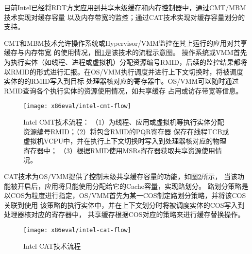 目前Intel已经将RDT方案应用到共享末级缓存和内存控制器中，通过CMT/MBM技术实现对缓存容量
以及内存带宽的监控；通过CAT技术实现对缓存容量划分的支持。

CMT和MBM技术允许操作系统或Hypervisor/VMM监控在其上运行的应用对共享缓存与内存带宽
的使用情况，图\ref{fig:intel-cmt-flow}是该技术的流程示意图。
操作系统或VMM首先为执行实体（如线程、进程或虚拟机）分配资源编号RMID，后续的监控结果都将
以RMID的形式进行汇报。在OS/VMM执行调度并进行上下文切换时，将被调度实体的的RMID写入到目标
处理器核对应的寄存器中。OS/VMM可以随时通过RMID查询各个执行实体的资源使用情况，如共享缓存
占用或访存带宽等信息。
 
\begin{figure}[H]
  \centering
  \texttt{[image: x86eval/intel-cmt-flow]}
  \caption[Intel Cache Monitor Technology (CMT) 技术流程]{Intel CMT技术流程：
   （1）为线程、应用或虚拟机等执行实体分配资源编号RMID；（2）将包含RMID的PQR寄存器
   保存在线程TCB或虚拟机VCPU中，并在执行上下文切换时写入到处理器核对应的物理寄存器中；
   （3）根据RMID使用MSRs寄存器获取共享资源使用情况。}
  \label{fig:intel-cmt-flow}
\end{figure}

CAT技术为OS/VMM提供了控制末级共享缓存容量的功能，如图\ref{fig:intel-cat-flow}所示，
当该功能被开启后，应用将只能使用分配给它的Cache容量，实现路划分。
路划分策略是以COS为粒度进行指定，OS/VMM首先为某一COS制定路划分策略，并将该COS关联到使用
该策略的执行实体中，并在上下文划分时将被调度实体的COS写入到处理器核对应的寄存器中，
共享缓存根据COS对应的策略来进行缓存替换操作。

\begin{figure}[H]
  \centering
  \texttt{[image: x86eval/intel-cat-flow]}
  \caption[Intel Cache Allocation Technology (CAT) 技术流程]{Intel CAT技术流程}
  \label{fig:intel-cat-flow}
\end{figure}



